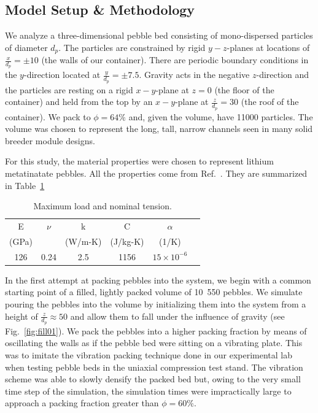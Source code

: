\subsection{Model Setup \& Methodology}\label{sec:dem-setup}
We analyze a three-dimensional pebble bed consisting of mono-dispersed particles of diameter $d_p$. The particles are constrained by rigid $y-z$-planes at locations of $\frac{x}{d_p} = \pm 10$ (the walls of our container). There are periodic boundary conditions in the $y$-direction located at $\frac{y}{d_p} = \pm 7.5$. Gravity acts in the negative $z$-direction and the particles are resting on a rigid $x-y$-plane at $z=0$ (the floor of the container) and held from the top by an $x-y$-plane at $\frac{z}{d_p} = 30$ (the roof of the container). We pack to $\phi = 64\%$ and, given the volume, have 11000 particles. The volume was chosen to represent the long, tall, narrow channels seen in many solid breeder module designs\cite{ Cho2008, Poitevin2010, Enoeda2003}.

For this study, the material properties were chosen to represent lithium metatinatate pebbles. All the properties come from Ref.~\cite{Gierszewski1998}. They are summarized in Table~\ref{tab:mat-props}

\begin {table}[tp] %
\caption{Maximum load and nominal tension.}
\label {tab:mat-props} \centering %
\begin {tabular}{ cccccc }
\toprule %
E           &     $\nu$    	&    k         	&    C          &   $\alpha$                \\
(GPa)    	&            	& (W/m-K) 		&  (J/kg-K)  	&   (1/K)                   \\\toprule
126			&      0.24     &  2.5          &  1156       	&   $15\times10^{-6}$		\\\bottomrule
\end{tabular}
\end{table}

In the first attempt at packing pebbles into the system, we begin with a common starting point of a filled, lightly packed volume of 10~550 pebbles. We simulate pouring the pebbles into the volume by initializing them into the system from a height of $\frac{z}{d_p} \approx 50$ and allow them to fall under the influence of gravity (see Fig.~\ref{fig:fill01}). We pack the pebbles into a higher packing fraction by means of oscillating the walls as if the pebble bed were sitting on a vibrating plate. This was to imitate the vibration packing technique done in our experimental lab when testing pebble beds in the uniaxial compression test stand. The vibration scheme was able to slowly densify the packed bed but, owing to the very small time step of the simulation, the simulation times were impractically large to approach a packing fraction greater than $\phi = 60\%$. 

